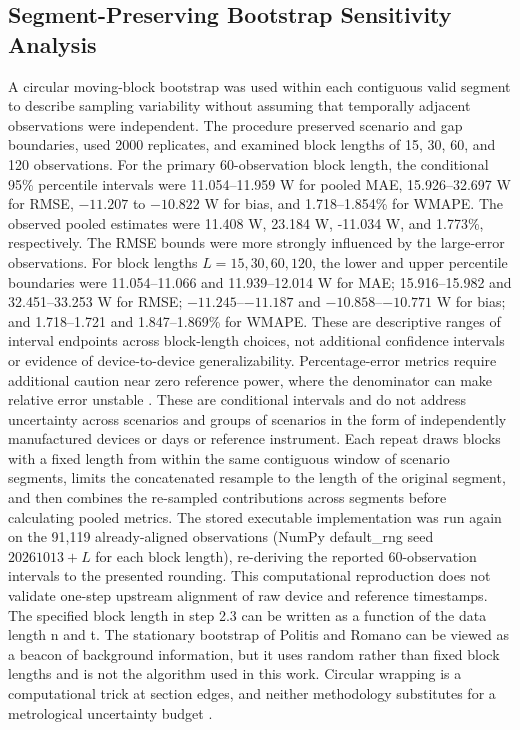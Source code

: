 \documentclass[technologies,article,submit,pdftex,moreauthors]{Definitions/mdpi}
\begin{document}
\subsection{Segment-Preserving Bootstrap Sensitivity Analysis}
\label{subsec:bootstrap-r2}
A circular moving-block bootstrap was used within each contiguous valid segment to describe sampling variability without assuming that temporally adjacent observations were independent. 
The procedure preserved scenario and gap boundaries, used 2000 replicates, and examined block lengths of 15, 30, 60, and 120 observations. For the primary 60-observation block length, the conditional 95\% percentile intervals were 11.054--11.959 W for pooled MAE, 15.926--32.697 W for RMSE, $-11.207$ to $-10.822$ W for bias, and 1.718--1.854\% for WMAPE.
The observed pooled estimates were 11.408 W, 23.184 W, -11.034 W, and 1.773\%, respectively. The RMSE bounds were more strongly influenced by the large-error observations. For block lengths $L=15,30,60,120$, the lower and upper percentile boundaries were 11.054--11.066 and 11.939--12.014 W for MAE; 15.916--15.982 and 32.451--33.253 W for RMSE; $-11.245$--$-11.187$ and $-10.858$--$-10.771$ W for bias; and 1.718--1.721 and 1.847--1.869\% for WMAPE. These are descriptive ranges of interval endpoints across block-length choices, not additional confidence intervals or evidence of device-to-device generalizability. Percentage-error metrics require additional caution near zero reference power, where the denominator can make relative error unstable \cite{r2_hyndman}. These are conditional intervals and do not address uncertainty across scenarios and groups of scenarios in the form of independently manufactured devices or days or reference instrument. Each repeat draws blocks with a fixed length from within the same contiguous window of scenario segments, limits the concatenated resample to the length of the original segment, and then combines the re-sampled contributions across segments before calculating pooled metrics. The stored executable implementation was run again on the 91,119 already-aligned observations (NumPy default\_rng seed $20261013+L$ for each block length), re-deriving the reported 60-observation intervals to the presented rounding. This computational reproduction does not validate one-step upstream alignment of raw device and reference timestamps. The specified block length in step 2.3 can be written as a function of the data length n and t. The stationary bootstrap of Politis and Romano \cite{r2_politis} can be viewed as a beacon of background information, but it uses random rather than fixed block lengths and is not the algorithm used in this work. Circular wrapping is a computational trick at section edges, and neither methodology substitutes for a metrological uncertainty budget \cite{r2_gum}. 
\end{document}
